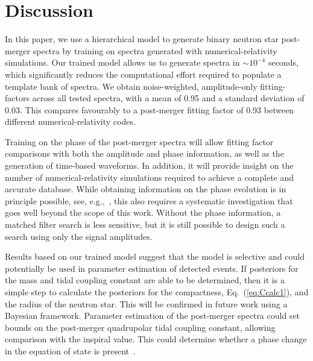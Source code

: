 \documentclass[../Thesis.tex]{subfiles}
\begin{document}
    \section{Discussion}
        In this paper, we use a hierarchical model to generate binary neutron star  post-merger spectra by training on spectra generated with numerical-relativity simulations. Our trained model allows us to generate spectra in ${\sim}10^{-4}$ seconds, which significantly reduces the computational effort required to populate a template bank of spectra. We obtain noise-weighted, amplitude-only fitting-factors across all tested spectra, with a mean of 0.95 and a standard deviation of 0.03. This compares favourably to a post-merger fitting factor of 0.93 between different numerical-relativity codes.\par
        Training on the phase of the post-merger spectra will allow fitting factor comparisons with both the amplitude and phase information, as well as the generation of time-based waveforms. In addition, it will provide insight on the number of numerical-relativity simulations required to achieve a complete and accurate database. While obtaining information on the phase evolution is in principle possible, see, e.g.,~\cite{Bose2018}, this also requires a systematic investigation that goes well beyond the scope of this work. Without the phase information, a matched filter search is less sensitive, but it is still possible to design such a search using only the signal amplitudes.
        \par
        Results based on our trained model suggest that the model is selective and could potentially be used in parameter estimation of detected events. If posteriors for the mass and tidal coupling constant are able to be determined, then it is a simple step to calculate the posteriors for the compactness, Eq.~(\ref{eq:Ccalc1}), and the radius of the neutron star. This will be confirmed in future work using a Bayesian framework. Parameter estimation of the post-merger spectra could set bounds on the post-merger quadrupolar tidal coupling constant, allowing comparison with the inspiral value. This could determine whether a phase change in the equation of state is present~\cite{Bauswein2018,Most2018b}.\par
\end{document}
